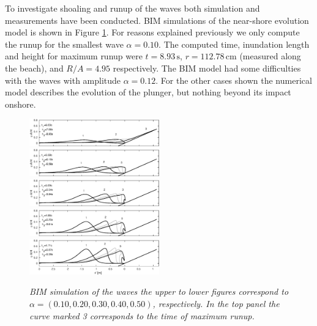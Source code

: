 \documentclass[review, authoryear]{elsarticle}
\newcommand{\s}{\,\mbox{s}}
\newcommand{\cm}{\,\mbox{cm}}
\begin{document}
To investigate shoaling and runup of the waves 
both simulation and measurements have been conducted. 
BIM simulations of the near-shore evolution model is shown in Figure \ref{fig:BIM}.
For reasons explained previously we only compute the runup for the 
smallest wave $\alpha=0.10$. The computed time, inundation length and height for 
maximum runup  
were $t=8.93\s$, $r=112.78\cm$ (measured along the beach), and $R/A=4.95$ 
respectively. The BIM model had some difficulties with the waves with amplitude $\alpha=0.12$. For the other cases shown the numerical
model describes the evolution of the plunger, but nothing beyond its impact onshore.  
\begin{figure}[]
\centering 
\includegraphics[width=0.5\textwidth]{./Figures/BIM/case10_BIM_runup.eps}
\includegraphics[width=0.5\textwidth]{./Figures/BIM/case20_BIM_runup.eps}
\includegraphics[width=0.5\textwidth]{./Figures/BIM/case30_BIM_runup.eps}
\includegraphics[width=0.5\textwidth]{./Figures/BIM/case40_BIM_runup.eps}
\includegraphics[width=0.5\textwidth]{./Figures/BIM/case50_BIM_runup.eps}
\caption{\textit{BIM simulation of the waves the upper to lower figures correspond to $\alpha=(0.10, 0.20, 0.30, 0.40, 0.50)$, respectively. In the top panel the curve marked 3 corresponds to the time of maximum runup.}}
\label{fig:BIM}
\end{figure}
\end{document}
